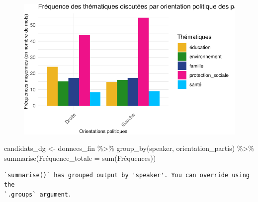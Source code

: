 \documentclass[
  letterpaper,
  DIV=11,
  numbers=noendperiod]{scrartcl}
\newenvironment{Shaded}{\begin{snugshade}}{\end{snugshade}}
\newcommand{\AttributeTok}[1]{\textcolor[rgb]{0.40,0.45,0.13}{#1}}
\newcommand{\FunctionTok}[1]{\textcolor[rgb]{0.28,0.35,0.67}{#1}}
\newcommand{\NormalTok}[1]{\textcolor[rgb]{0.00,0.23,0.31}{#1}}
\newcommand{\OtherTok}[1]{\textcolor[rgb]{0.00,0.23,0.31}{#1}}
\newcommand{\SpecialCharTok}[1]{\textcolor[rgb]{0.37,0.37,0.37}{#1}}
\begin{document}
\begin{figure}[H]

{\centering \includegraphics{Travail-Session_files/figure-pdf/unnamed-chunk-2-7.pdf}

}

\end{figure}

\begin{Shaded}
\begin{Highlighting}[]
\NormalTok{candidats\_dg }\OtherTok{\textless{}{-}}\NormalTok{ donnees\_fin }\SpecialCharTok{\%\textgreater{}\%} \FunctionTok{group\_by}\NormalTok{(speaker, orientation\_partis) }\SpecialCharTok{\%\textgreater{}\%} \FunctionTok{summarise}\NormalTok{(Fréquence}\AttributeTok{\_totale =} \FunctionTok{sum}\NormalTok{(Fréquences))}
\end{Highlighting}
\end{Shaded}

\begin{verbatim}
`summarise()` has grouped output by 'speaker'. You can override using the
`.groups` argument.
\end{verbatim}
\end{document}
